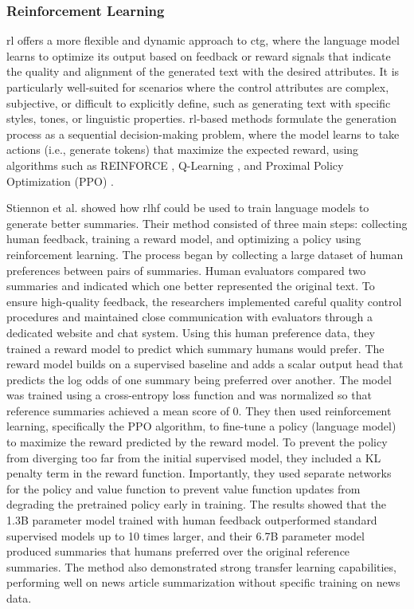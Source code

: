 
\subsubsection{Reinforcement Learning}
\gls{rl} offers a more flexible and dynamic approach to \gls{ctg}, where the language model learns to optimize its output based on feedback or reward signals that indicate the quality and alignment of the generated text with the desired attributes. 
It is particularly well-suited for scenarios where the control attributes are complex, subjective, or difficult to explicitly define, such as generating text with specific styles, tones, or linguistic properties. 
\gls{rl}-based methods formulate the generation process as a sequential decision-making problem, where the model learns to take actions (i.e., generate tokens) that maximize the expected reward, using algorithms such as REINFORCE \cite{10.1007/BF00992696}, Q-Learning \cite{Watkins1992-pa}, 
and Proximal Policy Optimization (PPO) \cite{schulman2017proximalpolicyoptimizationalgorithms}.

Stiennon et al. \Cite{stiennon2022learningsummarizehumanfeedback} showed how \gls{rlhf} could be used to train language models to generate better summaries.
Their method consisted of three main steps: collecting human feedback, training a reward model, and optimizing a policy using reinforcement learning.
The process began by collecting a large dataset of human preferences between pairs of summaries. 
Human evaluators compared two summaries and indicated which one better represented the original text. To ensure high-quality feedback, the researchers implemented careful quality control procedures and maintained close communication with evaluators through a dedicated website and chat system.
Using this human preference data, they trained a reward model to predict which summary humans would prefer. 
The reward model builds on a supervised baseline and adds a scalar output head that predicts the log odds of one summary being preferred over another.
The model was trained using a cross-entropy loss function and was normalized so that reference summaries achieved a mean score of 0.
They then used reinforcement learning, specifically the PPO algorithm, to fine-tune a policy (language model) to maximize the reward predicted by the reward model. 
To prevent the policy from diverging too far from the initial supervised model, they included a KL penalty term in the reward function. 
Importantly, they used separate networks for the policy and value function to prevent value function updates from degrading the pretrained policy early in training.
The results showed that the 1.3B parameter model trained with human feedback outperformed standard supervised models up to 10 times larger, and their 6.7B parameter model produced summaries that humans preferred over the original reference summaries. 
The method also demonstrated strong transfer learning capabilities, performing well on news article summarization without specific training on news data.

